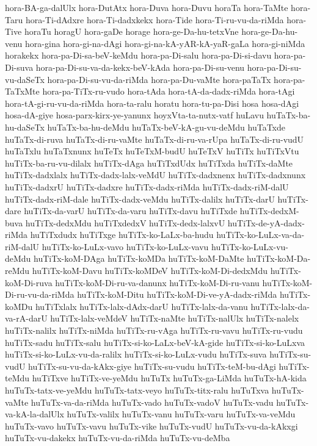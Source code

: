 {hora-BA-ga-dalUlx
hora-DutAtx
hora-Duva
hora-Duvu
horaTa
hora-TaMte
hora-Taru
hora-Ti-dAdxre
hora-Ti-dadxkekx
hora-Tide
hora-Ti-ru-vu-da-riMda
hora-Tive
horaTu
horagU
hora-gaDe
horage
hora-ge-Da-hu-tetxVne
hora-ge-Da-hu-venu
hora-gina
hora-gi-na-dAgi
hora-gi-na-kA-yAR-kA-yaR-gaLa
hora-gi-niMda
horakekx
hora-pa-Di-sa-beV-keMdu
hora-pa-Di-salu
hora-pa-Di-si-davu
hora-pa-Di-suva
hora-pa-Di-su-va-da-kekx-beV-kAda
hora-pa-Di-su-venu
hora-pa-Di-su-vu-daSeTx
hora-pa-Di-su-vu-da-riMda
hora-pa-Du-vaMte
hora-paTaTx
hora-pa-TaTxMte
hora-pa-TiTx-ru-vudo
hora-tAda
hora-tA-da-dadx-riMda
hora-tAgi
hora-tA-gi-ru-vu-da-riMda
hora-ta-ralu
horatu
hora-tu-pa-Disi
hosa
hosa-dAgi
hosa-dA-giye
hosa-parx-kirx-ye-yanunx
hoyxVta-ta-nutx-vatf
huLavu
huTaTx-ba-hu-daSeTx
huTaTx-ba-hu-deMdu
huTaTx-beV-kA-gu-vu-deMdu
huTaTxde
huTaTx-di-ruva
huTaTx-di-ru-vaMte
huTaTx-di-ru-va-rUpa
huTaTx-di-ru-vudU
huTaTxlu
huTaTxnunx
huTeTx
huTeTxM-budU
huTeTxV
huTiTx
huTiTxVtu
huTiTx-ba-ru-vu-dilalx
huTiTx-dAga
huTiTxdUdx
huTiTxda
huTiTx-daMte
huTiTx-dadxlalx
huTiTx-dadx-lalx-veMdU
huTiTx-dadxnenx
huTiTx-dadxnunx
huTiTx-dadxrU
huTiTx-dadxre
huTiTx-dadx-riMda
huTiTx-dadx-riM-dalU
huTiTx-dadx-riM-dale
huTiTx-dadx-veMdu
huTiTx-dalilx
huTiTx-darU
huTiTx-dare
huTiTx-da-varU
huTiTx-da-varu
huTiTx-davu
huTiTxde
huTiTx-dedxM-buva
huTiTx-dedxMdu
huTiTxdedxV
huTiTx-dedx-lalxvU
huTiTx-de-yA-dadx-riMda
huTiTxdudx
huTiTxge
huTiTx-ko-LaLx-ba-hudu
huTiTx-ko-LuLx-va-da-riM-dalU
huTiTx-ko-LuLx-vavo
huTiTx-ko-LuLx-vavu
huTiTx-ko-LuLx-vu-deMdu
huTiTx-koM-DAga
huTiTx-koMDa
huTiTx-koM-DaMte
huTiTx-koM-Da-reMdu
huTiTx-koM-Davu
huTiTx-koMDeV
huTiTx-koM-Di-dedxMdu
huTiTx-koM-Di-ruva
huTiTx-koM-Di-ru-va-danunx
huTiTx-koM-Di-ru-vanu
huTiTx-koM-Di-ru-vu-da-riMda
huTiTx-koM-Ditu
huTiTx-koM-Di-ve-yA-dadx-riMda
huTiTx-koMDu
huTiTxlalx
huTiTx-lalx-dAdx-darU
huTiTx-lalx-da-vanu
huTiTx-lalx-da-va-rA-darU
huTiTx-lalx-veMdeV
huTiTx-naMte
huTiTx-nalUlx
huTiTx-nalelx
huTiTx-nalilx
huTiTx-niMda
huTiTx-ru-vAga
huTiTx-ru-vavu
huTiTx-ru-vudu
huTiTx-sadu
huTiTx-salu
huTiTx-si-ko-LaLx-beV-kA-gide
huTiTx-si-ko-LuLxva
huTiTx-si-ko-LuLx-vu-da-ralilx
huTiTx-si-ko-LuLx-vudu
huTiTx-suva
huTiTx-su-vudU
huTiTx-su-vu-da-kAkx-giye
huTiTx-su-vudu
huTiTx-teM-bu-dAgi
huTiTx-teMdu
huTiTxve
huTiTx-ve-yeMdu
huTuTx
huTuTx-ga-LiMda
huTuTx-hA-kida
huTuTx-tatx-ve-yeMdu
huTuTx-tatx-veyo
huTuTx-titx-ralu
huTuTxva
huTuTx-vaMte
huTuTx-va-da-riMda
huTuTx-vado
huTuTx-vadoV
huTuTx-vadu
huTuTx-va-kA-la-dalUlx
huTuTx-valilx
huTuTx-vanu
huTuTx-varu
huTuTx-va-veMdu
huTuTx-vavo
huTuTx-vavu
huTuTx-vike
huTuTx-vudU
huTuTx-vu-da-kAkxgi
huTuTx-vu-dakekx
huTuTx-vu-da-riMda
huTuTx-vu-deMba
}
